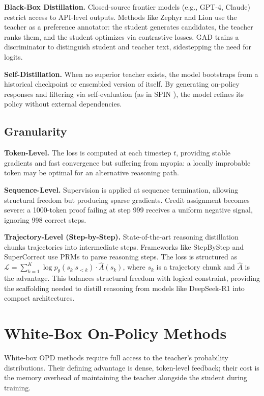 \documentclass{article} %
\newcommand{\ptheta}{p_\theta}
\newcommand{\loss}{\mathcal{L}}
\begin{document}
\textbf{Black-Box Distillation.} Closed-source frontier models (e.g., GPT-4, Claude) restrict access to API-level outputs. Methods like Zephyr \citep{2310.16944} and Lion \citep{2305.12870} use the teacher as a preference annotator: the student generates candidates, the teacher ranks them, and the student optimizes via contrastive losses. GAD \citep{2511.10643} trains a discriminator to distinguish student and teacher text, sidestepping the need for logits.

\textbf{Self-Distillation.} When no superior teacher exists, the model bootstraps from a historical checkpoint or ensembled version of itself. By generating on-policy responses and filtering via self-evaluation (as in SPIN \citep{2401.01335}), the model refines its policy without external dependencies.

\subsection{Granularity}
\label{subsec:tax_granularity}

\textbf{Token-Level.} The loss is computed at each timestep $t$, providing stable gradients and fast convergence but suffering from myopia: a locally improbable token may be optimal for an alternative reasoning path.

\textbf{Sequence-Level.} Supervision is applied at sequence termination, allowing structural freedom but producing sparse gradients. Credit assignment becomes severe: a 1000-token proof failing at step 999 receives a uniform negative signal, ignoring 998 correct steps.

\textbf{Trajectory-Level (Step-by-Step).} State-of-the-art reasoning distillation chunks trajectories into intermediate steps. Frameworks like StepByStep \citep{2305.02301} and SuperCorrect \citep{2410.09008} use PRMs \citep{2305.20050} to parse reasoning steps. The loss is structured as $\loss = \sum_{k=1}^K \log \ptheta(s_k | s_{<k}) \cdot \hat{A}(s_k)$, where $s_k$ is a trajectory chunk and $\hat{A}$ is the advantage. This balances structural freedom with logical constraint, providing the scaffolding needed to distill reasoning from models like DeepSeek-R1 into compact architectures.


\section{White-Box On-Policy Methods}
\label{sec:white_box}

White-box OPD methods require full access to the teacher's probability distributions. Their defining advantage is dense, token-level feedback; their cost is the memory overhead of maintaining the teacher alongside the student during training.
\end{document}
